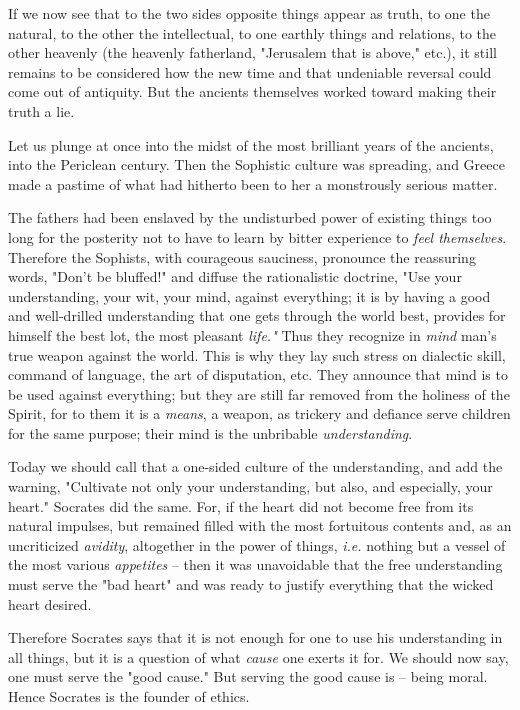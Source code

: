 \documentclass[a4paper]{book}
\begin{document}
If we now see that to the two sides opposite things appear as truth, to one 
the natural, to the other the intellectual, to one earthly things and 
relations, to the other heavenly (the heavenly fatherland, "{}Jerusalem that 
is above,"{} etc.), it still remains to be considered how the new time and 
that undeniable reversal could come out of antiquity. But the ancients 
themselves worked toward making their truth a lie.

Let us plunge at once into the midst of the most brilliant years of the 
ancients, into the Periclean century. Then the Sophistic culture was 
spreading, and Greece made a pastime of what had hitherto been to her a 
monstrously serious matter.

The fathers had been enslaved by the undisturbed power of existing things too 
long for the posterity not to have to learn by bitter experience to 
\textit{feel themselves}. Therefore the Sophists, with courageous sauciness, 
pronounce the reassuring words, "{}Don't be bluffed!"{} and diffuse the 
rationalistic doctrine, "{}Use your understanding, your wit, your mind, 
against everything; it is by having a good and well-drilled understanding that 
one gets through the world best, provides for himself the best lot, the most 
pleasant \textit{life."{}} Thus they recognize in \textit{mind} man's true 
weapon against the world. This is why they lay such stress on dialectic skill, 
command of language, the art of disputation, etc. They announce that mind is 
to be used against everything; but they are still far removed from the 
holiness of the Spirit, for to them it is a \textit{means}, a weapon, as 
trickery and defiance serve children for the same purpose; their mind is the 
unbribable \textit{understanding}.

Today we should call that a one-sided culture of the understanding, and add 
the warning, "{}Cultivate not only your understanding, but also, and 
especially, your heart."{} Socrates did the same. For, if the heart did not 
become free from its natural impulses, but remained filled with the most 
fortuitous contents and, as an uncriticized \textit{avidity}, altogether in 
the power of things, \textit{i.e.} nothing but a vessel of the most various 
\textit{appetites} -- then it was unavoidable that the free understanding must 
serve the "{}bad heart"{} and was ready to justify everything that the wicked 
heart desired.

Therefore Socrates says that it is not enough for one to use his understanding 
in all things, but it is a question of what \textit{cause} one exerts it for. 
We should now say, one must serve the "{}good cause."{} But serving the good 
cause is -- being moral. Hence Socrates is the founder of ethics.
\end{document}
